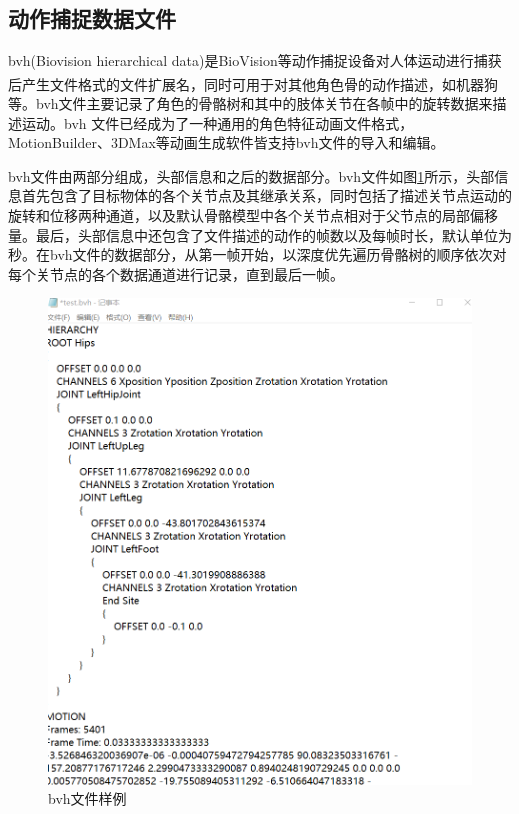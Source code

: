 \subsection{动作捕捉数据文件}{}
bvh(Biovision hierarchical data)是BioVision等动作捕捉设备对人体运动进行捕获后产生文件格式的文件扩展名\textsuperscript{\cite{p13}}，同时可用于对其他角色骨的动作描述，如机器狗等。bvh文件主要记录了角色的骨骼树和其中的肢体关节在各帧中的旋转数据来描述运动。bvh 文件已经成为了一种通用的角色特征动画文件格式，MotionBuilder、3DMax等动画生成软件皆支持bvh文件的导入和编辑。

bvh文件由两部分组成，头部信息和之后的数据部分。bvh文件如图\ref{fig:f15}所示，头部信息首先包含了目标物体的各个关节点及其继承关系，同时包括了描述关节点运动的旋转和位移两种通道，以及默认骨骼模型中各个关节点相对于父节点的局部偏移量。最后，头部信息中还包含了文件描述的动作的帧数以及每帧时长，默认单位为秒。在bvh文件的数据部分，从第一帧开始，以深度优先遍历骨骼树的顺序依次对每个关节点的各个数据通道进行记录，直到最后一帧。

\begin{figure}[h]
	\centering
	\includegraphics[scale=0.8]{figures/15.png}
	\caption{bvh文件样例}
	\label{fig:f15}
\end{figure}

